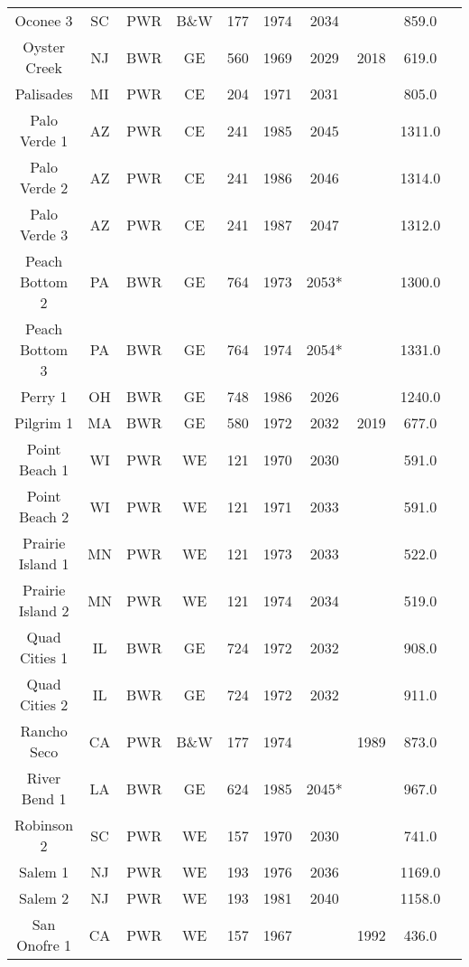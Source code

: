 \begin{table}[H]
\begin{tabular}{c c c c c c c c c c}
    Oconee 3            & SC & PWR & B\&W & 177 & 1974 & 2034 &      & 859.0 \\
    Oyster Creek        & NJ & BWR & GE   & 560 & 1969 & 2029 & 2018 & 619.0 \\
    Palisades           & MI & PWR & CE   & 204 & 1971 & 2031 &      & 805.0 \\
    Palo Verde 1        & AZ & PWR & CE   & 241 & 1985 & 2045 &      & 1311.0\\
    Palo Verde 2        & AZ & PWR & CE   & 241 & 1986 & 2046 &      & 1314.0\\
    Palo Verde 3        & AZ & PWR & CE   & 241 & 1987 & 2047 &      & 1312.0\\
    Peach Bottom 2      & PA & BWR & GE   & 764 & 1973 & 2053*&      & 1300.0\\
    Peach Bottom 3      & PA & BWR & GE   & 764 & 1974 & 2054*&      & 1331.0\\
    Perry 1             & OH & BWR & GE   & 748 & 1986 & 2026 &      & 1240.0\\
    Pilgrim 1           & MA & BWR & GE   & 580 & 1972 & 2032 & 2019 & 677.0 \\
    Point Beach 1       & WI & PWR & WE   & 121 & 1970 & 2030 &      & 591.0 \\
    Point Beach 2       & WI & PWR & WE   & 121 & 1971 & 2033 &      & 591.0 \\
    Prairie Island 1    & MN & PWR & WE   & 121 & 1973 & 2033 &      & 522.0 \\
    Prairie Island 2    & MN & PWR & WE   & 121 & 1974 & 2034 &      & 519.0 \\
    Quad Cities 1       & IL & BWR & GE   & 724 & 1972 & 2032 &      & 908.0 \\
    Quad Cities 2       & IL & BWR & GE   & 724 & 1972 & 2032 &      & 911.0 \\
    Rancho Seco         & CA & PWR & B\&W & 177 & 1974 &      & 1989 & 873.0 \\
    River Bend 1        & LA & BWR & GE   & 624 & 1985 & 2045*&      & 967.0 \\
    Robinson 2          & SC & PWR & WE   & 157 & 1970 & 2030 &      & 741.0 \\
    Salem 1             & NJ & PWR & WE   & 193 & 1976 & 2036 &      & 1169.0\\
    Salem 2             & NJ & PWR & WE   & 193 & 1981 & 2040 &      & 1158.0\\
    San Onofre 1        & CA & PWR & WE   & 157 & 1967 &      & 1992 & 436.0 \\

\end{tabular}
\end{table}

